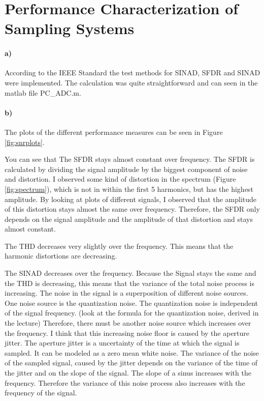 \section{Performance Characterization of Sampling Systems}

\paragraph{a)}

According to the IEEE Standard the test methods for SINAD, SFDR and SINAD were implemented.
The calculation was quite straightforward and can seen in the matlab file PC\_ADC.m.

\paragraph{b)}

The plots of the different performance measures can be seen in Figure \ref{fig:snrplots}.

You can see that The SFDR stays almost constant over frequency.
The SFDR is calculated by dividing the signal amplitude by the biggest component of noise
and distortion. I observed some kind of distortion in the spectrum (Figure \ref{fig:spectrum}), which
is not in within the first 5 harmonics, but has the highest amplitude. By looking at plots of
different signals, I observed that the amplitude of this distortion stays almost the same over frequency.
Therefore, the SFDR only depends on the signal amplitude and the amplitude of that distortion
and stays almost constant.

The THD decreases very slightly over the frequency. This means that the harmonic distortions are decreasing.

The SINAD decreases over the frequency. Because the Signal stays the same and the THD is decreasing,
this means that the variance of the total noise process is increasing.
The noise in the signal is a superposition of different noise sources. One noise source is
the quantization  noise. The quantization noise is independent of the signal frequency. (look at
the formula for the quantization noise, derived in the lecture) Therefore, 
there must be another noise source which increases over the frequency.
I think that this increasing noise floor is caused by the aperture jitter.
The aperture jitter is a uncertainty of the time at which the signal is sampled. It can be 
modeled as a zero mean white noise. The variance of the noise of the sampled signal, caused
by the jitter depends on the variance of the time of the jitter and on the slope of the
signal. The slope of a sinus increases with the frequency. Therefore the variance of this
noise process also increases with the frequency of the signal.



